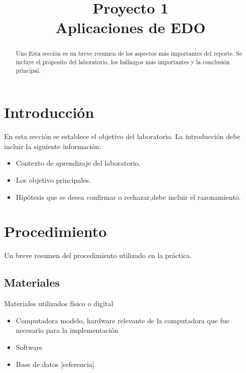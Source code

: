 \documentclass[article, 11pt]{IEEEtran}   %
\begin{document}
%
\title{Proyecto 1\\Aplicaciones de EDO}

\author{
}

\maketitle

\begin{abstract}
Uno Esta secci\'on es un breve resumen de los aspectos m\'as importantes del reporte. Se incluye el pr\'oposito del laboratorio, los hallazgos m\'as importantes y la conclusi\'on principal.
\end{abstract}

\section{Introducci\'on}
En esta secci\'on se establece el objetivo del laboratorio. La introducci\'on debe incluir la siguiente informaci\'on:
\begin{itemize}
	\item Contexto de aprendizaje del laboratorio.
	\item Los objetivo principales.
	\item Hip\'otesis que se desea confirmar o rechazar,debe incluir el razonamiento.
\end{itemize}
 
\section{Procedimiento}
Un breve resumen del procedimiento utilizado en la pr\'actica.

\subsection{Materiales}
Materiales utilizados f\'isico o digital
\begin{itemize}       							%
\item Computadora modelo, hardware relevante de la computadora que fue necesario para la implementaci\'on
\item Software
\item Base de datos [referencia]
\end{itemize}
\end{document}
